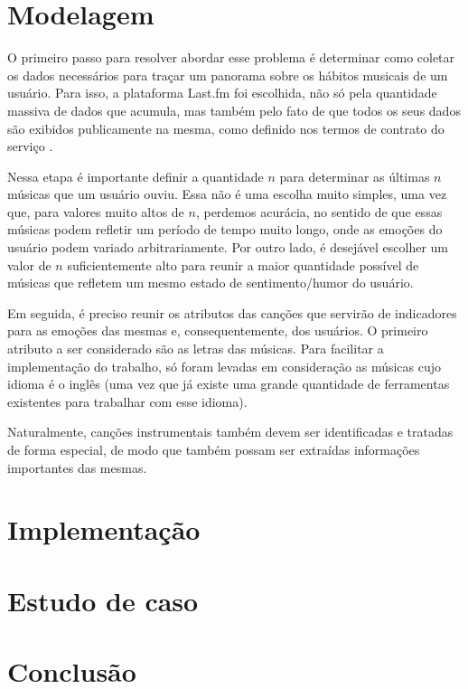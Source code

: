 \section{Modelagem}

O primeiro passo para resolver abordar esse problema é determinar como coletar os dados necessários para traçar um panorama sobre os hábitos
musicais de um usuário. Para isso, a plataforma Last.fm foi escolhida,
não só pela quantidade massiva de dados que acumula, mas também pelo
fato de que todos os seus dados são exibidos publicamente na mesma,
como definido nos termos de contrato do serviço \cite{Lastfmterms}.

Nessa etapa é importante definir a quantidade $ n $ para determinar
 as últimas $ n $ músicas que um usuário ouviu. Essa não é uma escolha
 muito simples, uma vez que, para valores muito altos de $ n $, perdemos
 acurácia, no sentido de que essas músicas podem refletir um período de
 tempo muito longo, onde as emoções do usuário podem variado 
 arbitrariamente. Por outro lado, é desejável escolher um valor de $ n $
 suficientemente alto para reunir a maior quantidade possível de músicas
 que refletem um mesmo estado de sentimento/humor do usuário.

Em seguida, é preciso reunir os atributos das canções que servirão de 
indicadores para as emoções das mesmas e, consequentemente, dos usuários.
O primeiro atributo a ser considerado são as letras das músicas. Para 
facilitar a implementação do trabalho, só foram levadas em consideração
as músicas cujo idioma é o inglês (uma vez que já existe uma grande
quantidade de ferramentas existentes para trabalhar com esse idioma).

Naturalmente, canções instrumentais também devem ser identificadas
e tratadas de forma especial, de modo que também possam ser extraídas 
informações importantes das mesmas.

\section{Implementação}



\section{Estudo de caso}



\section{Conclusão}